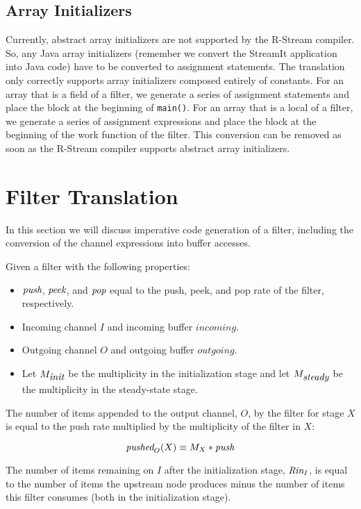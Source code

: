 \documentclass[10pt, letterpaper, onecolumn]{article}
\begin{document}
\subsection{Array Initializers}
Currently, abstract array initializers are not supported by the
R-Stream compiler.  So, any Java array initializers (remember we
convert the StreamIt application into Java code) have to be converted
to assignment statements.  The translation only correctly
supports array initializers composed entirely of constants.  For an
array that is a field of a filter, we generate a series of assignment
statements and place the block at the beginning of {\tt main()}.  For
an array that is a local of a filter, we generate a series of
assignment expressions and place the block at the beginning of the work
function of the filter.  This conversion can be removed as soon as the
R-Stream compiler supports abstract array initializers.
 
\section{Filter Translation}
\label{filter}
In this section we will discuss imperative code generation  of a
 filter, including the conversion of the channel expressions into
 buffer accesses.

Given a filter with the following properties:

\begin{itemize}
\item $\mbox{\it push}$, $\mbox{\it peek}$, and $\mbox{\it pop}$ equal to the push,
  peek, and pop rate of the filter, respectively.
\item Incoming channel $I$ and incoming buffer $incoming$.
\item Outgoing channel $O$ and outgoing buffer $outgoing$.
\item Let $M_{\mbox{\it init}}$ be the multiplicity in the initialization
  stage and let $M_{\mbox{\it steady}}$ be the multiplicity in the
  steady-state stage.
\end{itemize}

The number of items appended to the output channel, $O$, by the filter for
stage $X$ is equal to the push rate multiplied by the multiplicity of
the filter in $X$:

\begin{displaymath}
\mbox{\it pushed}_O(X) \equiv M_X * \mbox{\it push}
\end{displaymath} 

The number of items remaining on $I$ after the initialization
stage, $\mbox{\it Rin}_I$, is equal to the number of items the upstream node
produces minus the number of items this filter consumes (both in the
initialization stage).
\end{document}
